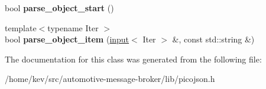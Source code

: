 \begin{DoxyCompactItemize}
\item 
\hypertarget{classpicojson_1_1deny__parse__context_a344343a42dca7a25057e35077e517fbf}{bool {\bfseries parse\+\_\+object\+\_\+start} ()}\label{classpicojson_1_1deny__parse__context_a344343a42dca7a25057e35077e517fbf}

\item 
\hypertarget{classpicojson_1_1deny__parse__context_a08a8add290a938e71285f7b72a24b91c}{{\footnotesize template$<$typename Iter $>$ }\\bool {\bfseries parse\+\_\+object\+\_\+item} (\hyperlink{classpicojson_1_1input}{input}$<$ Iter $>$ \&, const std\+::string \&)}\label{classpicojson_1_1deny__parse__context_a08a8add290a938e71285f7b72a24b91c}

\end{DoxyCompactItemize}


The documentation for this class was generated from the following file\+:\begin{DoxyCompactItemize}
\item 
/home/kev/src/automotive-\/message-\/broker/lib/picojson.\+h\end{DoxyCompactItemize}

